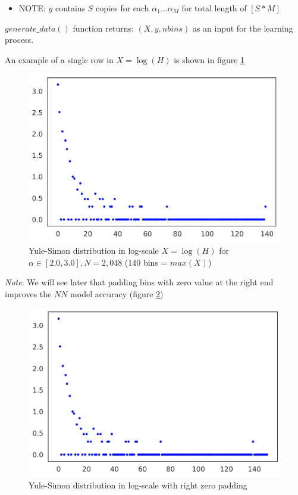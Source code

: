 \documentclass[a4paper, 12pt]{report}
\begin{document}
\begin{itemize}
  \item NOTE: $y$ contains $S$ copies for each $\alpha_1...\alpha_M$ for total length of $[S*M]$
\end{itemize}

$generate\_data()$ function returns: $(X, y, nbins)$ as an input for the learning process.

An example of a single row in $X = \log(H)$ is shown in figure  \ref{fig:yule-simon-log-scale}

\begin{figure}[!ht]
\centering
\includegraphics[width=0.7\linewidth]{./dataset}
\caption{Yule-Simon distribution in log-scale $X = \log(H)$ for $\alpha\in[2.0,3.0], N=2,048$ (140 bins = $max(X)$)}
\label{fig:yule-simon-log-scale}
\end{figure}

\textit{Note}: We will see later that padding bins with zero value at the right end improves the $NN$ model accuracy (figure  \ref{fig:yule-simon-log-scale-zeros-padding})

\begin{figure}[!ht]
\centering
\includegraphics[width=0.7\linewidth]{./dataset-zeros}
\caption{Yule-Simon distribution in log-scale with right zero padding}
\label{fig:yule-simon-log-scale-zeros-padding}
\end{figure}
\end{document}
